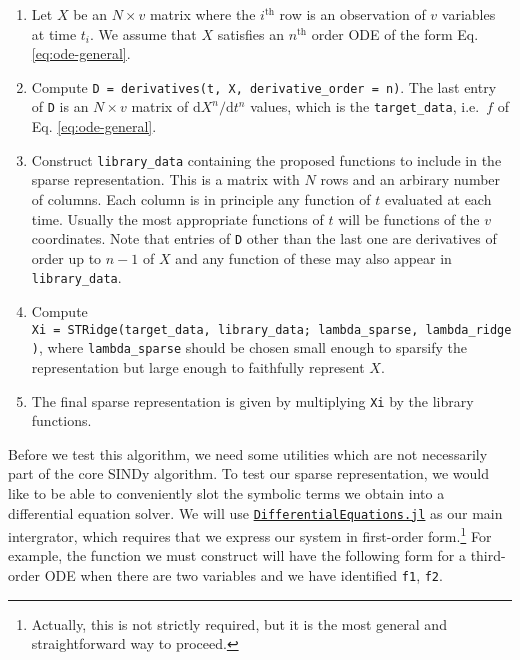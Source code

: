 \documentclass[
]{article}
\providecommand{\tightlist}{%
  \setlength{\itemsep}{0pt}\setlength{\parskip}{0pt}}\usepackage{longtable,booktabs,array}
\begin{document}
\begin{tcolorbox}[enhanced jigsaw, bottomrule=.15mm, toprule=.15mm, coltitle=black, colframe=quarto-callout-note-color-frame, colbacktitle=quarto-callout-note-color!10!white, bottomtitle=1mm, toptitle=1mm, opacitybacktitle=0.6, titlerule=0mm, title={SINDy {[}standard{]}}, left=2mm, leftrule=.75mm, rightrule=.15mm, breakable, colback=white, arc=.35mm, opacityback=0]

\begin{enumerate}
\def\labelenumi{\arabic{enumi}.}
\tightlist
\item
  Let \(X\) be an \(N \times v\) matrix where the \(i^\text{th}\) row is
  an observation of \(v\) variables at time \(t_i\). We assume that
  \(X\) satisfies an \(n^\text{th}\) order ODE of the form Eq.
  \eqref{eq:ode-general}.
\item
  Compute \texttt{D\ =\ derivatives(t,\ X,\ derivative\_order\ =\ n)}.
  The last entry of \texttt{D} is an \(N \times v\) matrix of
  \(\text{d}X^n/\text{d}t^n\) values, which is the
  \texttt{target\_data}, i.e.~\(f\) of Eq. \eqref{eq:ode-general}.
\item
  Construct \texttt{library\_data} containing the proposed functions to
  include in the sparse representation. This is a matrix with \(N\) rows
  and an arbirary number of columns. Each column is in principle any
  function of \(t\) evaluated at each time. Usually the most appropriate
  functions of \(t\) will be functions of the \(v\) coordinates. Note
  that entries of \texttt{D} other than the last one are derivatives of
  order up to \(n - 1\) of \(X\) and any function of these may also
  appear in \texttt{library\_data}.
\item
  Compute
  \texttt{Xi\ =\ STRidge(target\_data,\ library\_data;\ lambda\_sparse,\ lambda\_ridge)},
  where \texttt{lambda\_sparse} should be chosen small enough to
  sparsify the representation but large enough to faithfully represent
  \(X\).
\item
  The final sparse representation is given by multiplying \texttt{Xi} by
  the library functions.
\end{enumerate}

\end{tcolorbox}

Before we test this algorithm, we need some utilities which are not
necessarily part of the core SINDy algorithm. To test our sparse
representation, we would like to be able to conveniently slot the
symbolic terms we obtain into a differential equation solver. We will
use
\href{https://docs.sciml.ai/DiffEqDocs/latest/}{\texttt{DifferentialEquations.jl}}
as our main intergrator, which requires that we express our system in
first-order
form.\footnote{Actually, this is not strictly required, but it is the most general and straightforward way to proceed.}
For example, the function we must construct will have the following form
for a third-order ODE when there are two variables and we have
identified \texttt{f1}, \texttt{f2}.
\end{document}
